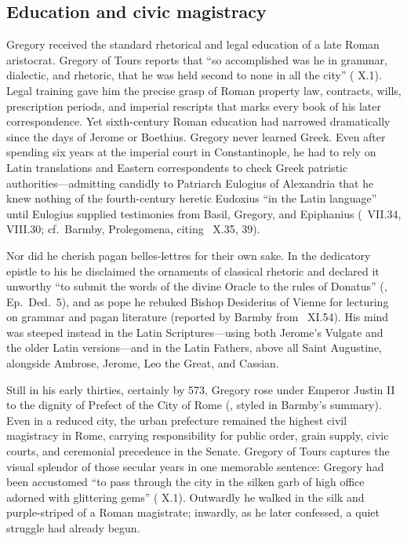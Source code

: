 \subsection{Education and civic magistracy}

Gregory received the standard rhetorical and legal education of a late Roman
aristocrat. Gregory of Tours reports that ``so accomplished was he in grammar,
dialectic, and rhetoric, that he was held second to none in all the city''
( X.1). Legal training gave him the precise grasp of
Roman property law, contracts, wills, prescription periods, and imperial
rescripts that marks every book of his later correspondence. Yet sixth-century
Roman education had narrowed dramatically since the days of Jerome or
Boethius. Gregory never learned Greek. Even after spending six years at the
imperial court in Constantinople, he had to rely on Latin translations and
Eastern correspondents to check Greek patristic authorities---admitting candidly
to Patriarch Eulogius of Alexandria that he knew nothing of the fourth-century
heretic Eudoxius ``in the Latin language'' until Eulogius supplied testimonies
from Basil, Gregory, and Epiphanius (\ VII.34, VIII.30; cf.\ Barmby,
Prolegomena, citing \ X.35, 39).

Nor did he cherish pagan belles-lettres for their own sake. In the dedicatory
epistle to his  he disclaimed the ornaments of classical
rhetoric and declared it unworthy ``to submit the words of the divine Oracle to
the rules of Donatus'' (, Ep.\ Ded.\ 5), and as pope he rebuked
Bishop Desiderius of Vienne for lecturing on grammar and pagan literature
(reported by Barmby from \ XI.54). His mind was steeped instead in
the Latin Scriptures---using both Jerome's Vulgate and the older Latin
versions---and in the Latin Fathers, above all Saint Augustine, alongside
Ambrose, Jerome, Leo the Great, and Cassian.

Still in his early thirties, certainly by 573, Gregory rose under Emperor
Justin II to the dignity of Prefect of the City of Rome (, styled  in Barmby's summary). Even in a reduced
city, the urban prefecture remained the highest civil magistracy in Rome,
carrying responsibility for public order, grain supply, civic courts, and
ceremonial precedence in the Senate. Gregory of Tours captures the visual
splendor of those secular years in one memorable sentence: Gregory had been
accustomed ``to pass through the city in the silken garb of high office
adorned with glittering gems'' ( X.1). Outwardly he
walked in the silk and purple-striped  of a Roman magistrate;
inwardly, as he later confessed, a quiet struggle had already begun.
